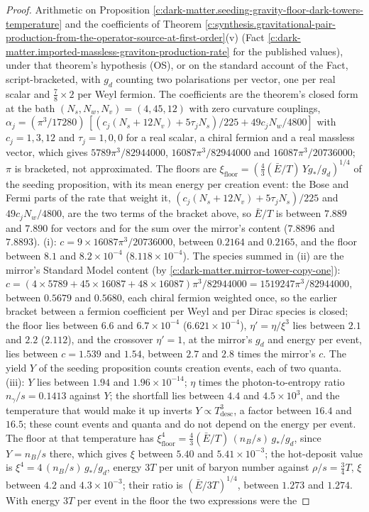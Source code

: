 \documentclass[11pt]{article}
\theoremstyle{definition}
\theoremstyle{plain}
\begin{document}
\begin{proof}
Arithmetic on Proposition \ref{c:dark-matter.seeding-gravity-floor-dark-towers-temperature} and the coefficients of Theorem \ref{c:synthesis.gravitational-pair-production-from-the-operator-source-at-first-order}(v) (Fact \ref{c:dark-matter.imported-massless-graviton-production-rate} for the published values), under that theorem's hypothesis (OS), or on the standard account of the Fact, script-bracketed, with $g_{d}$ counting two polarisations per vector, one per real scalar and $\tfrac{7}{8} \times 2$ per Weyl fermion. The coefficients are the theorem's closed form at the bath $(N_{s}, N_{w}, N_{v}) = (4, 45, 12)$ with zero curvature couplings, $\alpha_{j} = (\pi^{3}/17280)\,[(c_{j}(N_{s} + 12N_{v}) + 5\tau_{j}N_{s})/225 + 49c_{j}N_{w}/4800]$ with $c_{j} = 1, 3, 12$ and $\tau_{j} = 1, 0, 0$ for a real scalar, a chiral fermion and a real massless vector, which gives $5789\pi^{3}/82944000$, $16087\pi^{3}/82944000$ and $16087\pi^{3}/20736000$; $\pi$ is bracketed, not approximated. The floors are $\xi_{\mathrm{floor}} = (\tfrac43(\bar{E}/T)\,Y g_{*}/g_{d})^{1/4}$ of the seeding proposition, with its mean energy per creation event: the Bose and Fermi parts of the rate that weight it, $(c_{j}(N_{s} + 12N_{v}) + 5\tau_{j}N_{s})/225$ and $49c_{j}N_{w}/4800$, are the two terms of the bracket above, so $\bar{E}/T$ is between $7.889$ and $7.890$ for vectors and for the sum over the mirror's content ($7.8896$ and $7.8893$). (i): $c = 9 \times 16087\pi^{3}/20736000$, between $0.2164$ and $0.2165$, and the floor between $8.1$ and $8.2 \times 10^{-4}$ ($8.118 \times 10^{-4}$). The species summed in (ii) are the mirror's Standard Model content (by \ref{c:dark-matter.mirror-tower-copy-one}): $c = (4 \times 5789 + 45 \times 16087 + 48 \times 16087)\pi^{3}/82944000 = 1519247\pi^{3}/82944000$, between $0.5679$ and $0.5680$, each chiral fermion weighted once, so the earlier bracket between a fermion coefficient per Weyl and per Dirac species is closed; the floor lies between $6.6$ and $6.7 \times 10^{-4}$ ($6.621 \times 10^{-4}$), $\eta' = \eta/\xi^{3}$ lies between $2.1$ and $2.2$ ($2.112$), and the crossover $\eta' = 1$, at the mirror's $g_{d}$ and energy per event, lies between $c = 1.539$ and $1.54$, between $2.7$ and $2.8$ times the mirror's $c$. The yield $Y$ of the seeding proposition counts creation events, each of two quanta. (iii): $Y$ lies between $1.94$ and $1.96 \times 10^{-14}$; $\eta$ times the photon-to-entropy ratio $n_{\gamma}/s = 0.1413$ against $Y$; the shortfall lies between $4.4$ and $4.5 \times 10^{3}$, and the temperature that would make it up inverts $Y \propto T_{\mathrm{desc}}^{3}$, a factor between $16.4$ and $16.5$; these count events and quanta and do not depend on the energy per event. The floor at that temperature has $\xi_{\mathrm{floor}}^{4} = \tfrac43(\bar{E}/T)\,(n_{B}/s)\,g_{*}/g_{d}$, since $Y = n_{B}/s$ there, which gives $\xi$ between $5.40$ and $5.41 \times 10^{-3}$; the hot-deposit value is $\xi^{4} = 4\,(n_{B}/s)\,g_{*}/g_{d}$, energy $3T$ per unit of baryon number against $\rho/s = \tfrac34 T$, $\xi$ between $4.2$ and $4.3 \times 10^{-3}$; their ratio is $(\bar{E}/3T)^{1/4}$, between $1.273$ and $1.274$. With energy $3T$ per event in the floor the two expressions were the 
\end{proof}
\end{document}
